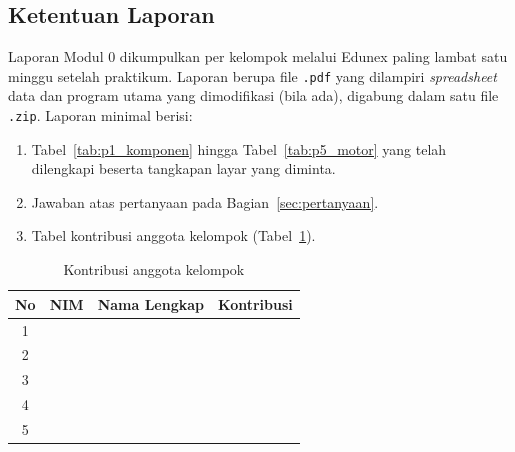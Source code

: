 \documentclass[11pt,a4paper]{article}
\begin{document}
\subsection{Ketentuan Laporan}
Laporan Modul 0 dikumpulkan per kelompok melalui Edunex paling lambat satu minggu setelah praktikum. Laporan berupa file \texttt{.pdf} yang dilampiri \textit{spreadsheet} data dan program utama yang dimodifikasi (bila ada), digabung dalam satu file \texttt{.zip}. Laporan minimal berisi:
\begin{enumerate}
	\item Tabel~\ref{tab:p1_komponen} hingga Tabel~\ref{tab:p5_motor} yang telah dilengkapi beserta tangkapan layar yang diminta.
	\item Jawaban atas pertanyaan pada Bagian~\ref{sec:pertanyaan}.
	\item Tabel kontribusi anggota kelompok (Tabel~\ref{tab:kontribusi}).
\end{enumerate}

\begin{table}[H]
	\centering
	\caption{Kontribusi anggota kelompok}
	\label{tab:kontribusi}
	\begin{tabularx}{\textwidth}{|c|c|l|X|}
		\hline
		\textbf{No} & \textbf{NIM} & \textbf{Nama Lengkap} & \textbf{Kontribusi} \\
		\hline
		1           &              &                       &                     \\
		2           &              &                       &                     \\
		3           &              &                       &                     \\
		4           &              &                       &                     \\
		5           &              &                       &                     \\
		\hline
	\end{tabularx}
\end{table}
\end{document}
